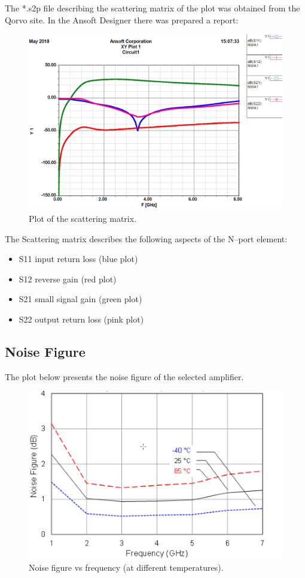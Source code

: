 \documentclass[a4paper, 11pt]{report}
\begin{document}
\noindent
The *.s2p file describing the scattering matrix of the plot was obtained from the Qorvo site. In the Ansoft Designer there was prepared a report:
\begin{figure}[h]
	\centering
	\includegraphics[width=0.7\linewidth]{chip-plot}
	\caption{Plot of the scattering matrix.}
	\label{fig:chip-plot}
\end{figure}

The Scattering matrix describes the following aspects of the N--port element:
\begin{itemize}
\item S11 input return loss  (blue plot)
\item S12 reverse gain       (red plot)
\item S21 small signal gain  (green plot)
\item S22 output return loss (pink plot)
\end{itemize}

\subsection*{Noise Figure}
The plot below presents the noise figure of the selected amplifier.
\begin{figure}[h]
	\centering
	\includegraphics[width=0.6\linewidth]{noise}
	\caption{Noise figure vs frequency (at different temperatures).}
	\label{fig:noise}
\end{figure}
\end{document}
